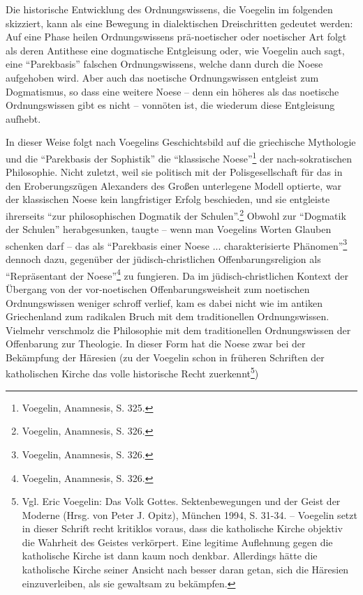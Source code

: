 Die historische Entwicklung des Ordnungswissens, die Voegelin im folgenden
skizziert, kann als eine Bewegung in dialektischen Dreischritten gedeutet
werden: Auf eine Phase heilen Ordnungswissens prä-noetischer oder noetischer
Art folgt als deren Antithese eine dogmatische Entgleisung oder, wie Voegelin
auch sagt, eine "`Parekbasis"' falschen Ordnungswissens, welche dann durch die
Noese aufgehoben wird. Aber auch das noetische Ordnungswissen entgleist zum
Dogmatismus, so dass eine weitere Noese -- denn ein höheres als das noetische
Ordnungswissen gibt es nicht -- vonnöten ist, die wiederum diese Entgleisung 
aufhebt.

In dieser Weise folgt nach Voegelins Geschichtsbild auf die griechische
Mythologie und die "`Parekbasis der Sophistik"' die "`klassische
Noese"'\footnote{Voegelin, Anamnesis, S. 325.} der nach-sokratischen
Philosophie. Nicht zuletzt, weil sie politisch mit der Polisgesellschaft für
das in den Eroberungszügen Alexanders des Großen unterlegene Modell optierte,
war der klassischen Noese kein langfristiger Erfolg beschieden, und sie
entgleiste ihrerseits "`zur philosophischen Dogmatik der
Schulen"'.\footnote{Voegelin, Anamnesis, S. 326.} Obwohl zur "`Dogmatik der
Schulen"' herabgesunken, taugte -- wenn man Voegelins Worten Glauben schenken
darf -- das als "`Parekbasis einer Noese ...  charakterisierte
Phänomen"'\footnote{Voegelin, Anamnesis, S. 326.} dennoch dazu, gegenüber der
jüdisch-christlichen Offenbarungsreligion als "`Repräsentant der
Noese"'\footnote{Voegelin, Anamnesis, S. 326.} zu fungieren. Da im
jüdisch-christlichen Kontext der Übergang von der vor-noetischen
Offenbarungsweisheit zum noetischen Ordnungswissen weniger schroff verlief,
kam es dabei nicht wie im antiken Griechenland zum radikalen Bruch mit dem
traditionellen Ordnungswissen. Vielmehr verschmolz die Philosophie mit dem
traditionellen Ordnungswissen der Offenbarung zur Theologie. In dieser Form
hat die Noese zwar bei der Bekämpfung der Häresien (zu der Voegelin schon in
früheren Schriften der katholischen Kirche das volle historische Recht
zuerkennt\footnote{Vgl. Eric Voegelin: Das Volk Gottes. Sektenbewegungen und
  der Geist der Moderne (Hrsg. von Peter J. Opitz), München 1994, S. 31-34.  --
  Voegelin setzt in dieser Schrift recht kritiklos voraus, dass die
  katholische Kirche objektiv die Wahrheit des Geistes verkörpert. Eine
  legitime Auflehnung gegen die katholische Kirche ist dann kaum noch denkbar.
  Allerdings hätte die katholische Kirche seiner Ansicht nach besser daran
  getan, sich die Häresien einzuverleiben, als sie gewaltsam zu bekämpfen.})
